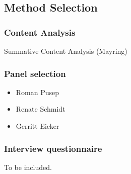 \subsection{Method Selection}

\subsubsection{Content Analysis}

Summative Content Analysis (Mayring)

\subsubsection{Panel selection}

\begin{itemize}
 \item Roman Pusep
 \item Renate Schmidt
 \item Gerritt Eicker
\end{itemize}

\subsubsection{Interview questionnaire}

To be included.
